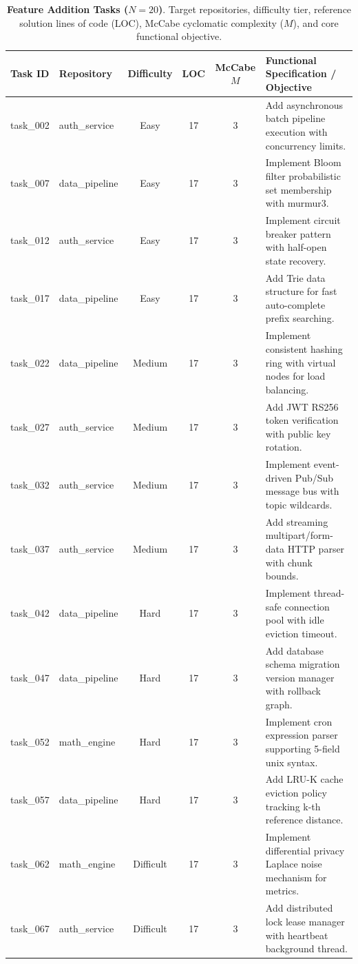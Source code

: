 \begin{table}[t]
\centering
\scriptsize
\caption{\textbf{Feature Addition Tasks ($N=20$)}. Target repositories, difficulty tier, reference solution lines of code (LOC), McCabe cyclomatic complexity ($M$), and core functional objective.}
\label{tab:tasks_feature}
\begin{tabular}{llcccl}
\toprule
\textbf{Task ID} & \textbf{Repository} & \textbf{Difficulty} & \textbf{LOC} & \textbf{McCabe $M$} & \textbf{Functional Specification / Objective} \\
\midrule
task\_002 & auth\_service & Easy & 17 & 3 & Add asynchronous batch pipeline execution with concurrency limits. \\
task\_007 & data\_pipeline & Easy & 17 & 3 & Implement Bloom filter probabilistic set membership with murmur3. \\
task\_012 & auth\_service & Easy & 17 & 3 & Implement circuit breaker pattern with half-open state recovery. \\
task\_017 & data\_pipeline & Easy & 17 & 3 & Add Trie data structure for fast auto-complete prefix searching. \\
task\_022 & data\_pipeline & Medium & 17 & 3 & Implement consistent hashing ring with virtual nodes for load balancing. \\
task\_027 & auth\_service & Medium & 17 & 3 & Add JWT RS256 token verification with public key rotation. \\
task\_032 & auth\_service & Medium & 17 & 3 & Implement event-driven Pub/Sub message bus with topic wildcards. \\
task\_037 & auth\_service & Medium & 17 & 3 & Add streaming multipart/form-data HTTP parser with chunk bounds. \\
task\_042 & data\_pipeline & Hard & 17 & 3 & Implement thread-safe connection pool with idle eviction timeout. \\
task\_047 & data\_pipeline & Hard & 17 & 3 & Add database schema migration version manager with rollback graph. \\
task\_052 & math\_engine & Hard & 17 & 3 & Implement cron expression parser supporting 5-field unix syntax. \\
task\_057 & data\_pipeline & Hard & 17 & 3 & Add LRU-K cache eviction policy tracking k-th reference distance. \\
task\_062 & math\_engine & Difficult & 17 & 3 & Implement differential privacy Laplace noise mechanism for metrics. \\
task\_067 & auth\_service & Difficult & 17 & 3 & Add distributed lock lease manager with heartbeat background thread. \\

\end{tabular}
\end{table}
